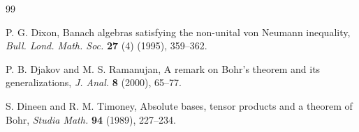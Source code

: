\documentclass[a4paper,12pt]{amsart}
\theoremstyle{definition}
\begin{document}
\begin{thebibliography}{99}
	
	
	 {\sc P. G. Dixon}, Banach algebras satisfying the non-unital von Neumann inequality, \textit{Bull. Lond. Math. Soc.} \textbf{27} (4) (1995), 359--362.
	
	 {\sc P. B. Djakov} and {\sc M. S. Ramanujan}, A remark on Bohr's theorem and its generalizations, \textit{J. Anal.} \textbf{8} (2000), 65--77.
	
	 {\sc S. Dineen} and {\sc R. M. Timoney}, Absolute bases, tensor products and a theorem of Bohr, \textit{Studia Math.} \textbf{94} (1989), 227--234.
	
	
	
	
	
	
	
	
	
	
	

\end{thebibliography}
\end{document}
